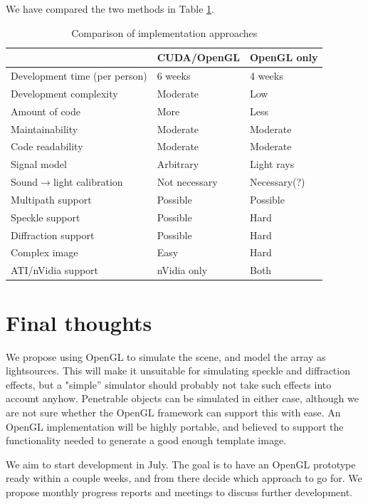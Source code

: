 \documentclass[
   article                                      %
 , 12pt                                         %
 , xelatex                                      %
 , bibtex                                       %
 , layout
]{common/mytemplate}
\begin{document}
We have compared the two methods in Table \ref{comparison}.

\begin{table}[t]\centering
\begin{tabular}[c]{l l l}\hline
\rowcolor{tabBlue}                  & CUDA/OpenGL    & OpenGL only \\\hline
Development time (per person)       & 6 weeks        & 4 weeks     \\
Development complexity              & Moderate       & Low \\
Amount of code                      & More           & Less \\
Maintainability                     & Moderate       & Moderate \\
Code readability                    & Moderate       & Moderate \\
Signal model                        & Arbitrary      & Light rays  \\
Sound$\rightarrow$light calibration & Not necessary  & Necessary(?) \\
Multipath support                   & Possible       & Possible \\
Speckle support                     & Possible       & Hard \\
Diffraction support                 & Possible       & Hard \\
Complex image                       & Easy           & Hard \\
ATI/nVidia support                  & nVidia only    & Both \\
\end{tabular}
\vspace{5pt}\caption{Comparison of implementation approaches}\label{comparison}
\end{table}


\section{Final thoughts}

We propose using OpenGL to simulate the scene, and model the array as lightsources. This will make it unsuitable for simulating speckle and diffraction effects, but a "simple'' simulator should probably not take such effects into account anyhow. Penetrable objects can be simulated in either case, although we are not sure whether the OpenGL framework can support this with ease. An OpenGL implementation will be highly portable, and believed to support the functionality needed to generate a good enough template image.

We aim to start development in July. The goal is to have an OpenGL prototype ready within a couple weeks, and from there decide which approach to go for. We propose monthly progress reports and meetings to discuss further 
development.
\end{document}

